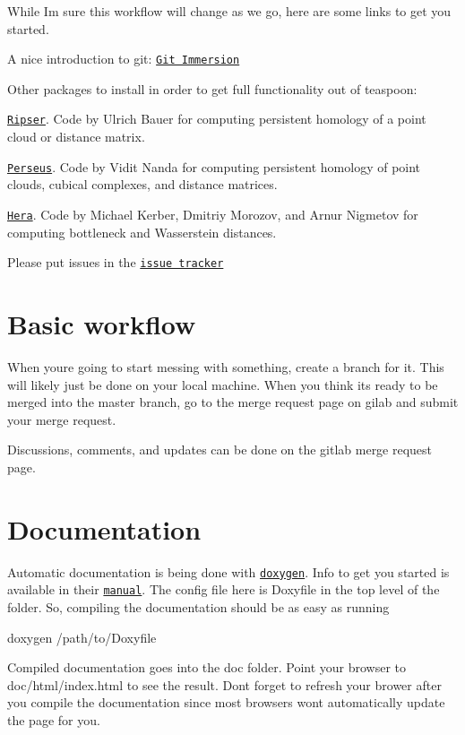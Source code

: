 While I\textquotesingle{}m sure this workflow will change as we go, here are some links to get you started.


\begin{DoxyItemize}
\item A nice introduction to git\+: \href{http://gitimmersion.com/}{\tt Git Immersion}
\item Other packages to install in order to get full functionality out of teaspoon\+:
\begin{DoxyItemize}
\item \href{https://github.com/Ripser/ripser}{\tt Ripser}. Code by Ulrich Bauer for computing persistent homology of a point cloud or distance matrix.
\item \href{http://people.maths.ox.ac.uk/nanda/perseus/index.html}{\tt Perseus}. Code by Vidit Nanda for computing persistent homology of point clouds, cubical complexes, and distance matrices.
\item \href{https://bitbucket.org/grey_narn/hera}{\tt Hera}. Code by Michael Kerber, Dmitriy Morozov, and Arnur Nigmetov for computing bottleneck and Wasserstein distances.
\end{DoxyItemize}
\item Please put issues in the \href{https://gitlab.msu.edu/TSAwithTDA/teaspoon/issues}{\tt issue tracker}
\end{DoxyItemize}

\section*{Basic workflow}

When you\textquotesingle{}re going to start messing with something, create a branch for it. This will likely just be done on your local machine. When you think it\textquotesingle{}s ready to be merged into the master branch, go to the merge request page on gilab and submit your merge request.

Discussions, comments, and updates can be done on the gitlab merge request page.

\section*{Documentation}

Automatic documentation is being done with \href{www.doxygen.org}{\tt doxygen}. Info to get you started is available in their \href{http://www.stack.nl/~dimitri/doxygen/manual/index.html}{\tt manual}. The config file here is {\ttfamily Doxyfile} in the top level of the folder. So, compiling the documentation should be as easy as running 
\begin{DoxyCode}
doxygen /path/to/Doxyfile
\end{DoxyCode}
 Compiled documentation goes into the {\ttfamily doc} folder. Point your browser to {\ttfamily doc/html/index.\+html} to see the result. Don\textquotesingle{}t forget to refresh your brower after you compile the documentation since most browsers won\textquotesingle{}t automatically update the page for you.

